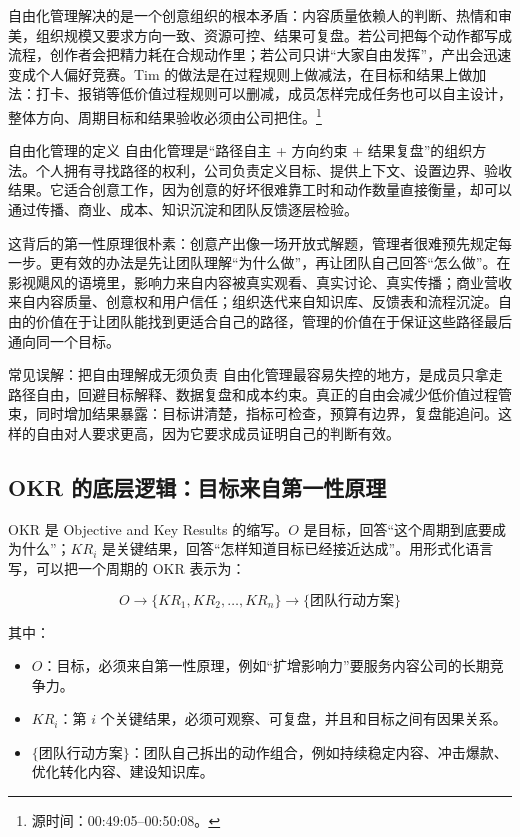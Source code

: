 \documentclass[a4paper]{article}
\begin{document}
自由化管理解决的是一个创意组织的根本矛盾：内容质量依赖人的判断、热情和审美，组织规模又要求方向一致、资源可控、结果可复盘。若公司把每个动作都写成流程，创作者会把精力耗在合规动作里；若公司只讲“大家自由发挥”，产出会迅速变成个人偏好竞赛。Tim 的做法是在过程规则上做减法，在目标和结果上做加法：打卡、报销等低价值过程规则可以删减，成员怎样完成任务也可以自主设计，整体方向、周期目标和结果验收必须由公司把住。\footnote{源时间：00:49:05--00:50:08。}

\begin{importantbox}{自由化管理的定义}
自由化管理是“路径自主 + 方向约束 + 结果复盘”的组织方法。个人拥有寻找路径的权利，公司负责定义目标、提供上下文、设置边界、验收结果。它适合创意工作，因为创意的好坏很难靠工时和动作数量直接衡量，却可以通过传播、商业、成本、知识沉淀和团队反馈逐层检验。
\end{importantbox}

这背后的第一性原理很朴素：创意产出像一场开放式解题，管理者很难预先规定每一步。更有效的办法是先让团队理解“为什么做”，再让团队自己回答“怎么做”。在影视飓风的语境里，影响力来自内容被真实观看、真实讨论、真实传播；商业营收来自内容质量、创意权和用户信任；组织迭代来自知识库、反馈表和流程沉淀。自由的价值在于让团队能找到更适合自己的路径，管理的价值在于保证这些路径最后通向同一个目标。

\begin{warningbox}{常见误解：把自由理解成无须负责}
自由化管理最容易失控的地方，是成员只拿走路径自由，回避目标解释、数据复盘和成本约束。真正的自由会减少低价值过程管束，同时增加结果暴露：目标讲清楚，指标可检查，预算有边界，复盘能追问。这样的自由对人要求更高，因为它要求成员证明自己的判断有效。
\end{warningbox}

\subsection{OKR 的底层逻辑：目标来自第一性原理}

OKR 是 Objective and Key Results 的缩写。$O$ 是目标，回答“这个周期到底要成为什么”；$KR_i$ 是关键结果，回答“怎样知道目标已经接近达成”。用形式化语言写，可以把一个周期的 OKR 表示为：

$$
O \longrightarrow \{KR_1, KR_2, \ldots, KR_n\} \longrightarrow \{\text{团队行动方案}\}
$$

其中：
\begin{itemize}
  \item $O$：目标，必须来自第一性原理，例如“扩增影响力”要服务内容公司的长期竞争力。
  \item $KR_i$：第 $i$ 个关键结果，必须可观察、可复盘，并且和目标之间有因果关系。
  \item $\{\text{团队行动方案}\}$：团队自己拆出的动作组合，例如持续稳定内容、冲击爆款、优化转化内容、建设知识库。
\end{itemize}
\end{document}
